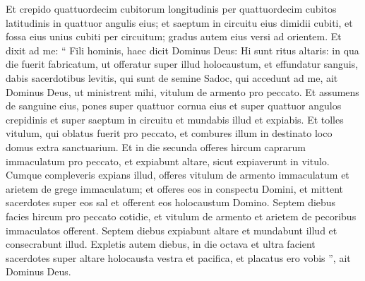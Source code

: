 \begin{biblechapter}
\begin{biblechapter}
\begin{biblechapter}
\begin{biblechapter}
\begin{biblechapter}
\begin{biblechapter}
\begin{biblechapter}
\begin{biblechapter}
\begin{biblechapter}
\begin{biblechapter}
\begin{biblechapter}
\begin{biblechapter}
\begin{biblechapter}
\begin{biblechapter}
\begin{biblechapter}
\begin{biblechapter}
\begin{biblechapter}
\begin{biblechapter}
\begin{biblechapter}
\begin{biblechapter}
\begin{biblechapter}
\begin{biblechapter}
\begin{biblechapter}
\begin{biblechapter}
\begin{biblechapter}
\begin{biblechapter}
\begin{biblechapter}
\begin{biblechapter}
\begin{biblechapter}
\begin{biblechapter}
\begin{biblechapter}
\begin{biblechapter}
\begin{biblechapter}
\begin{biblechapter}
\begin{biblechapter}
\begin{biblechapter}
\begin{biblechapter}
\begin{biblechapter}
\begin{biblechapter}
\begin{biblechapter}
\begin{biblechapter}
\begin{biblechapter}
\begin{biblechapter}
\verse Et crepido quattuordecim cubitorum longitudinis per quattuordecim cubitos latitudinis in quattuor angulis eius; et saeptum in circuitu eius dimidii cubiti, et fossa eius unius cubiti per circuitum; gradus autem eius versi ad orientem.
 \verse Et dixit ad me: “ Fili hominis, haec dicit Dominus Deus: Hi sunt ritus altaris: in qua die fuerit fabricatum, ut offeratur super illud holocaustum, et effundatur sanguis, 
\verse dabis sacerdotibus levitis, qui sunt de semine Sadoc, qui accedunt ad me, ait Dominus Deus, ut ministrent mihi, vitulum de armento pro peccato. 
\verse Et assumens de sanguine eius, pones super quattuor cornua eius et super quattuor angulos crepidinis et super saeptum in circuitu et mundabis illud et expiabis. 
\verse Et tolles vitulum, qui oblatus fuerit pro peccato, et combures illum in destinato loco domus extra sanctuarium. 
\verse Et in die secunda offeres hircum caprarum immaculatum pro peccato, et expiabunt altare, sicut expiaverunt in vitulo. 
\verse Cumque compleveris expians illud, offeres vitulum de armento immaculatum et arietem de grege immaculatum; 
\verse et offeres eos in conspectu Domini, et mittent sacerdotes super eos sal et offerent eos holocaustum Domino. 
\verse Septem diebus facies hircum pro peccato cotidie, et vitulum de armento et arietem de pecoribus immaculatos offerent. 
\verse Septem diebus expiabunt altare et mundabunt illud et consecrabunt illud. 
\verse Expletis autem diebus, in die octava et ultra facient sacerdotes super altare holocausta vestra et pacifica, et placatus ero vobis ”, ait Dominus Deus.
 

\end{biblechapter}
\end{biblechapter}
\end{biblechapter}
\end{biblechapter}
\end{biblechapter}
\end{biblechapter}
\end{biblechapter}
\end{biblechapter}
\end{biblechapter}
\end{biblechapter}
\end{biblechapter}
\end{biblechapter}
\end{biblechapter}
\end{biblechapter}
\end{biblechapter}
\end{biblechapter}
\end{biblechapter}
\end{biblechapter}
\end{biblechapter}
\end{biblechapter}
\end{biblechapter}
\end{biblechapter}
\end{biblechapter}
\end{biblechapter}
\end{biblechapter}
\end{biblechapter}
\end{biblechapter}
\end{biblechapter}
\end{biblechapter}
\end{biblechapter}
\end{biblechapter}
\end{biblechapter}
\end{biblechapter}
\end{biblechapter}
\end{biblechapter}
\end{biblechapter}
\end{biblechapter}
\end{biblechapter}
\end{biblechapter}
\end{biblechapter}
\end{biblechapter}
\end{biblechapter}
\end{biblechapter}
